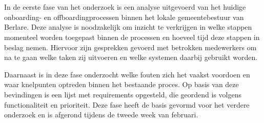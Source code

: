 
\chapter{}%
\label{ch:methodologie}


In de eerste fase van het onderzoek is een analyse uitgevoerd van het huidige onboarding- en off\-boar\-ding\-pro\-ces\-sen binnen het lokale gemeentebestuur van Berlare. Deze analyse is noodzakelijk om inzicht te verkrijgen in welke stappen momenteel worden toegepast binnen de processen en hoeveel tijd deze stappen in beslag nemen. Hiervoor zijn gesprekken gevoerd met betrokken medewerkers om na te gaan welke taken zij uitvoeren en welke systemen daarbij gebruikt worden.

Daarnaast is in deze fase onderzocht welke fouten zich het vaakst voordoen en waar knelpunten optreden binnen het bestaande proces. Op basis van deze bevindingen is een lijst met requirements opgesteld, die geordend is volgens functionaliteit en prioriteit. Deze fase heeft de basis gevormd voor het verdere onderzoek en is afgerond tijdens de tweede week van februari. \newline

